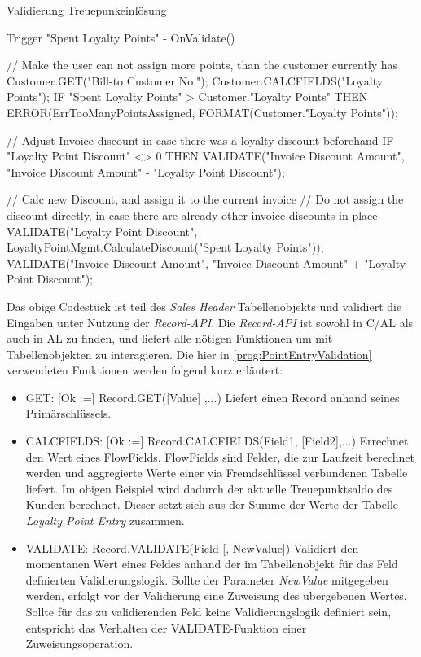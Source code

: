 \begin{program}  %
	\caption{Validierung Treuepunkeinlösung}
	\label{prog:PointEntryValidation}
	\begin{JavaCode}
Trigger "Spent Loyalty Points" - OnValidate()

// Make the user can not assign more points, than the customer currently has
Customer.GET("Bill-to Customer No.");
Customer.CALCFIELDS("Loyalty Points");
IF "Spent Loyalty Points" > Customer."Loyalty Points" THEN
  ERROR(ErrTooManyPointsAssigned, FORMAT(Customer."Loyalty Points"));

// Adjust Invoice discount in case there was a loyalty discount beforehand
IF "Loyalty Point Discount" <> 0 THEN
  VALIDATE("Invoice Discount Amount", 
           "Invoice Discount Amount" - "Loyalty Point Discount");

// Calc new Discount, and assign it to the current invoice
// Do not assign the discount directly, in case there are already other invoice discounts in place
VALIDATE("Loyalty Point Discount", 
         LoyaltyPointMgmt.CalculateDiscount("Spent Loyalty Points"));
VALIDATE("Invoice Discount Amount", 
         "Invoice Discount Amount" + "Loyalty Point Discount");
	\end{JavaCode}
\end{program}

Das obige Codestück ist teil des \textit{Sales Header} Tabellenobjekts und validiert die Eingaben unter Nutzung der \textit{Record-API}. Die \textit{Record-API} ist sowohl in C/AL als auch in AL zu finden, und liefert alle nötigen Funktionen um mit Tabellenobjekten zu interagieren. Die hier in \ref{prog:PointEntryValidation} verwendeten Funktionen werden folgend kurz erläutert: 
\begin{itemize}
	\item GET: [Ok :=] Record.GET([Value] ,...) Liefert einen Record anhand seines Primärschlüssels.
	\item CALCFIELDS: [Ok :=] Record.CALCFIELDS(Field1, [Field2],...) Errechnet den Wert eines FlowFields. FlowFields sind Felder, die zur Laufzeit berechnet werden und aggregierte Werte einer via Fremdschlüssel verbundenen Tabelle liefert. Im obigen Beispiel wird dadurch der aktuelle Treuepunktsaldo des Kunden berechnet. Dieser setzt sich aus der Summe der Werte der Tabelle \textit{Loyalty Point Entry} zusammen.
	\item VALIDATE: Record.VALIDATE(Field [, NewValue]) Validiert den momentanen Wert eines Feldes anhand der im Tabellenobjekt für das Feld defnierten Validierungslogik. Sollte der Parameter \textit{NewValue} mitgegeben werden, erfolgt vor der Validierung eine Zuweisung des übergebenen Wertes. Sollte für das zu validierenden Feld keine Validierungslogik definiert sein, entspricht das Verhalten der VALIDATE-Funktion einer Zuweisungsoperation.
\end{itemize}

